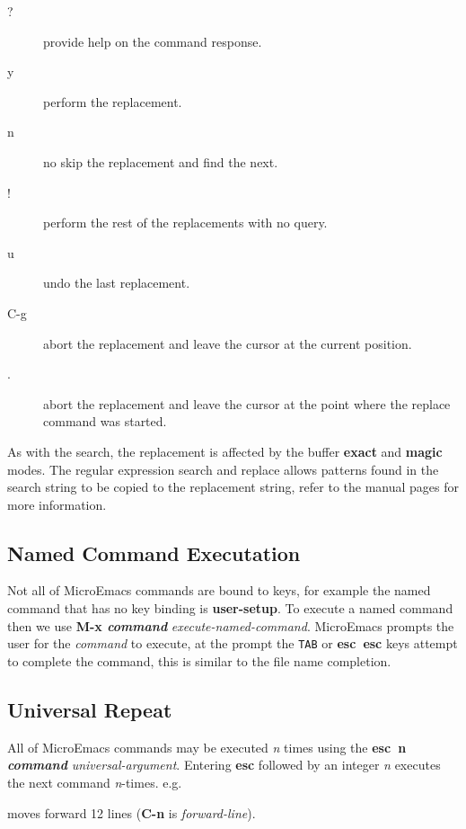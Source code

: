 \documentclass[11pt,a4paper,pdftex]{article}
\begin{document}
  \begin{description}
    \item[?] provide help on the command response.
    \item[y] perform the replacement.
    \item[n] no skip the replacement and find the next.
    \item[!] perform the rest of the replacements with no query.
    \item[u] undo the last replacement.
    \item[C-g] abort the replacement and leave the cursor at the current
    position.
    \item[.] abort the replacement and leave the cursor at the point where the
    replace command was started.
  \end{description}

  As with the search, the replacement is affected by the buffer \textbf{exact}
  and \textbf{magic} modes. The regular expression search and replace allows
  patterns found in the search string to be copied to the replacement string,
  refer to the manual pages for more information.

\subsection{Named Command Executation}

  Not all of MicroEmacs commands are bound to keys, for example the named
  command that has no key binding is \textbf{user-setup}. To execute a named
  command then we use \textbf{M-x \textit{command}}
  \textit{execute-named-command}. MicroEmacs prompts the user for the
  \textit{command} to execute, at the prompt the \texttt{TAB} or
  \textbf{esc~esc} keys attempt to complete the command, this is similar to
  the file name completion.

\subsection{Universal Repeat}

  All of MicroEmacs commands may be executed \textit{n} times using the
  \textbf{esc~n \textit{command}} \textit{universal-argument}. Entering
  \textbf{esc} followed by an integer \textit{n} executes the next command
  \textit{n}-times. e.g.


  moves forward 12 lines (\textbf{C-n} is \textit{forward-line}).
\end{document}

